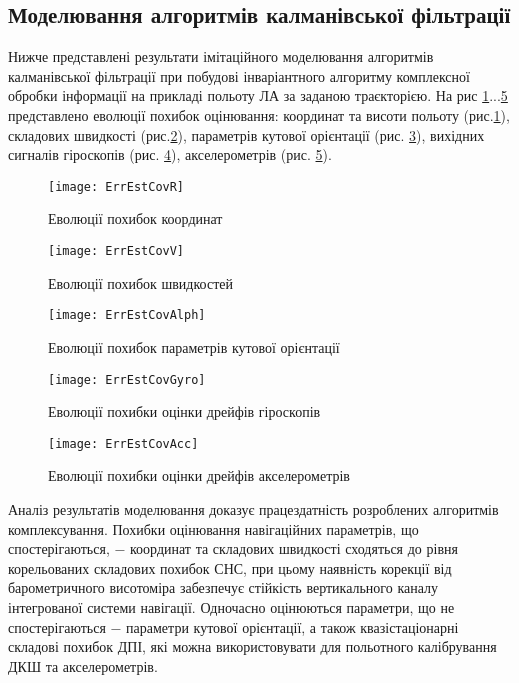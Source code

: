 \subsection{Моделювання алгоритмів калманівської фільтрації}

Нижче представлені результати імітаційного моделювання алгоритмів калманівської фільтрації при побудові інваріантного алгоритму комплексної обробки інформації на прикладі польоту ЛА за заданою траєкторією. На рис \ref{fig:ErrEstCovR}...\ref{fig:ErrEstCovAcc} представлено еволюції похибок оцінювання: координат та висоти польоту (рис.\ref{fig:ErrEstCovR}), складових швидкості (рис.\ref{fig:ErrEstCovV}), параметрів кутової орієнтації (рис. \ref{fig:ErrEstCovAlph}), вихідних сигналів гіроскопів (рис. \ref{fig:ErrEstCovGyro}), акселерометрів (рис. \ref{fig:ErrEstCovAcc}).

\begin{figure}[H]
\centering
\texttt{[image: ErrEstCovR]}
\caption{Еволюції похибок координат}
\label{fig:ErrEstCovR}
\end{figure}
\begin{figure}[H]
\centering
\texttt{[image: ErrEstCovV]}
\caption{Еволюції похибок швидкостей}
\label{fig:ErrEstCovV}
\end{figure}

\begin{figure}[H]
\centering
\texttt{[image: ErrEstCovAlph]}
\caption{Еволюції похибок параметрів кутової орієнтації}
\label{fig:ErrEstCovAlph}
\end{figure}

\begin{figure}[H]
\centering
\texttt{[image: ErrEstCovGyro]}
\caption{Еволюції похибки оцінки дрейфів гіроскопів}
\label{fig:ErrEstCovGyro}
\end{figure}

\begin{figure}[H]
\centering
\texttt{[image: ErrEstCovAcc]}
\caption{Еволюції похибки оцінки дрейфів акселерометрів}
\label{fig:ErrEstCovAcc}
\end{figure}
Аналіз результатів моделювання доказує працездатність розроблених алгоритмів комплексування. Похибки оцінювання навігаційних параметрів, що спостерігаються, − координат та складових швидкості сходяться до рівня корельованих складових похибок СНС, при цьому наявність корекції від барометричного висотоміра забезпечує стійкість вертикального каналу інтегрованої системи навігації. Одночасно оцінюються параметри, що не спостерігаються − параметри кутової орієнтації, а також квазістаціонарні складові похибок ДПІ, які можна використовувати для польотного калібрування ДКШ та акселерометрів.  

